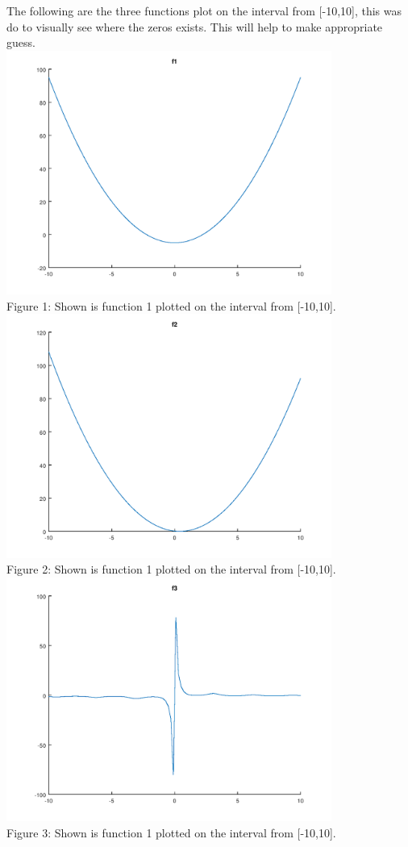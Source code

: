 \documentclass{article}
\begin{document}
The following are the three functions plot on the interval from [-10,10], this was do to visually see where the zeros exists. This will help to make appropriate guess.\\

\includegraphics[height=8cm]{f1.png}\\
Figure 1: Shown is function 1 plotted on the interval from [-10,10].\\
\includegraphics[height=8cm]{f2.png}\\
Figure 2: Shown is function 1 plotted on the interval from [-10,10].\\
\includegraphics[height=8cm]{f3.png}\\
Figure 3: Shown is function 1 plotted on the interval from [-10,10].\\
\end{document}
